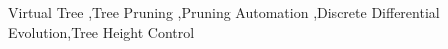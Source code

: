 \begin{keyword}
Virtual Tree  \sep Tree Pruning \sep Pruning Automation \sep Discrete Differential Evolution\sep Tree Height Control
\end{keyword}
